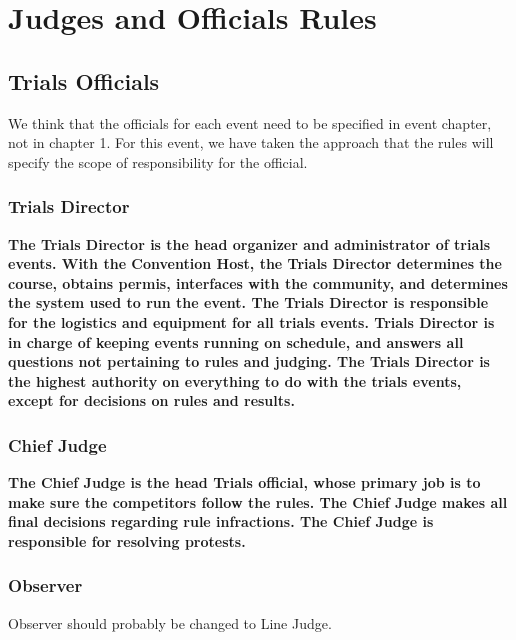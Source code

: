 \chapter{Judges and Officials Rules}

\section{Trials Officials}

\begin{framed}
We think that the officials for each event need to be specified in event chapter, not in chapter 1. For this event, we have taken the approach that the rules will specify the scope of responsibility for the official.
\end{framed}

\subsection{Trials Director}

\textbf{The Trials Director is the head organizer and administrator of trials
events.  With the Convention Host, the Trials Director determines the course,
obtains permis, interfaces with the community, and determines the system
used to run the event.  The Trials Director is responsible for the logistics and
equipment for all trials events.  
Trials Director is in charge of keeping events running on schedule, and
answers all questions not pertaining to rules and judging.  The Trials
Director is the highest authority on everything to do with the trials
events, except for decisions on rules and results.}

\subsection{Chief Judge}

\textbf{The Chief Judge is the head Trials official, whose primary job is to make sure
the competitors follow the rules.  The Chief Judge makes all final decisions
regarding rule infractions. The Chief Judge is responsible for resolving
protests.}

\subsection{Observer}

\begin{framed}
Observer should probably be changed to Line Judge.
\end{framed}

